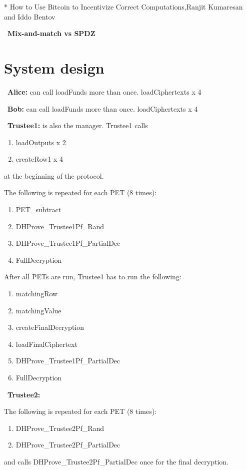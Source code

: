 * How to Use Bitcoin to Incentivize Correct Computations,Ranjit Kumaresan and Iddo Bentov


~\textbf{Mix-and-match vs SPDZ}
\section{System design}

~\textbf{Alice:} can call loadFunds more than once. loadCiphertexts  x 4

~\textbf{Bob:} can call loadFunds more than once. loadCiphertexts x 4

~\textbf{Trustee1:} is also the manager. Trustee1 calls  
\begin{enumerate}
	\item loadOutputs  x 2
	\item  createRow1  x 4
\end{enumerate}
at the beginning of the protocol. 
\newline

The following is repeated for each PET (8 times): 
\begin{enumerate}
	\item PET\_subtract
	\item DHProve\_Trustee1Pf\_Rand
	\item DHProve\_Trustee1Pf\_PartialDec
	 \item FullDecryption
\end{enumerate}

After all PETs are run, Trustee1 has to run the following:
\begin{enumerate}
	\item matchingRow
	\item matchingValue
	\item createFinalDecryption
	\item loadFinalCiphertext
	\item DHProve\_Trustee1Pf\_PartialDec
	\item FullDecryption
\end{enumerate}

~\textbf{Trustee2:} 

The following is repeated for each PET (8 times): 
\begin{enumerate}
	\item DHProve\_Trustee2Pf\_Rand 
	\item DHProve\_Trustee2Pf\_PartialDec
\end{enumerate}
and calls DHProve\_Trustee2Pf\_PartialDec once for the final decryption.


